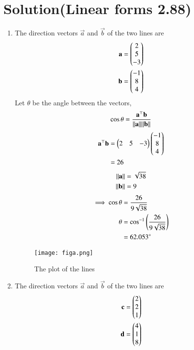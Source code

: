 \documentclass[journal,12pt,twocolumn]{IEEEtran}
\begin{document}
\section{Solution(Linear forms 2.88)}
\begin{enumerate}
    \item 
    The direction vectors $\vec{a}$ and $\vec{b}$ of the two lines are
    \begin{align}
        \mathbf{a}=\begin{pmatrix}2\\5\\-3\end{pmatrix}\\
        \mathbf{b}=\begin{pmatrix}-1\\8\\4\end{pmatrix}
    \end{align}
    Let $\theta$ be the angle between the vectors,
    \begin{align}
        \cos\theta = \frac{\mathbf{a}^\top \mathbf{b}}{\lVert\mathbf{a}\rVert {\lVert\mathbf{b}\rVert}}
    \end{align}
    \begin{align}
        \mathbf{a}^\top\mathbf{b}&=\begin{pmatrix}2&5&-3\end{pmatrix}\begin{pmatrix}-1\\8\\4\end{pmatrix}\\
                           &=26
    \end{align}
    \begin{align}
        \lVert\mathbf{a}\rVert &=\sqrt{38}\\
        \lVert\mathbf{b}\rVert &=9
    \end{align}
    \begin{align}
        \implies \cos\theta & = \frac{26}{9\sqrt{38}}\\
          \theta &= \cos^{-1}\left(\frac{26}{9\sqrt{38}}\right)\\
                 &= 62.053\degree
    \end{align}
    \begin{figure}[!ht]
    \centering
    \texttt{[image: figa.png]}
    \caption{The plot of the lines}
    \end{figure}
    \item 
    The direction vectors $\vec{a}$ and $\vec{b}$ of the two lines are
    \begin{align}
        \mathbf{c}=\begin{pmatrix}2\\2\\1\end{pmatrix}\\
        \mathbf{d}=\begin{pmatrix}4\\1\\8\end{pmatrix}
    \end{align}

\end{enumerate}
\end{document}
